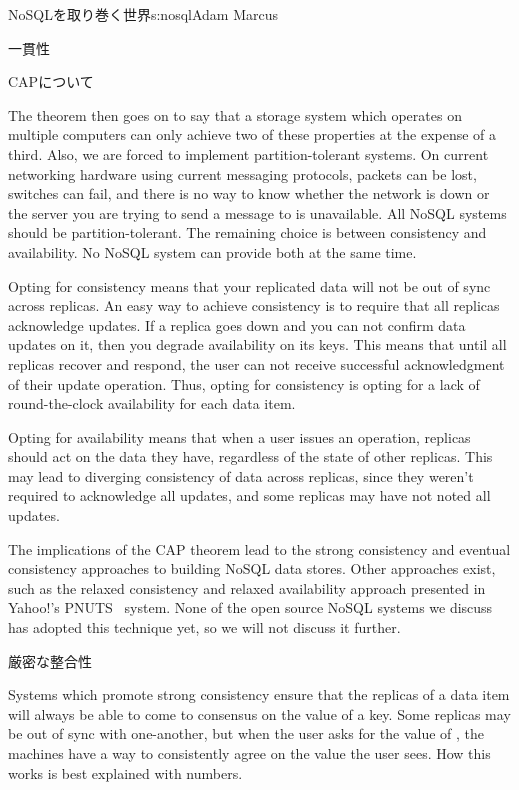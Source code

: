 \begin{aosachapter}{NoSQLを取り巻く世界}{s:nosql}{Adam Marcus}
\begin{aosasect1}{一貫性}
\begin{aosasect2}{CAPについて}
\begin{aosadescription}
\end{aosadescription}

The theorem then goes on to say that a storage system which operates on
multiple computers can only achieve two of these properties at the
expense of a third.  Also, we are forced to implement partition-tolerant
systems.  On current networking
hardware using current messaging protocols, packets can be lost,
switches can fail, and there is no way to know whether the network is
down or the server you are trying to send a message to is unavailable.
All NoSQL systems should be partition-tolerant.  The remaining choice
is between consistency and availability.  No NoSQL system can provide
both at the same time.

Opting for consistency means that your replicated data will not be out
of sync across replicas.  An easy way to achieve consistency is to
require that all replicas acknowledge updates.  If a replica goes down
and you can not confirm data updates on it, then you degrade
availability on its keys.  This means that until all replicas recover and respond, the user can not
receive successful acknowledgment of their update operation.  Thus, opting
for consistency is opting for a lack of round-the-clock availability
for each data item.

Opting for availability means that when a user issues an operation,
replicas should act on the
data they have, regardless of the state of other replicas.  This may
lead to diverging consistency of data across replicas, since they
weren't required to acknowledge all updates, and some replicas may
have not noted all updates.

The implications of the CAP theorem lead to the strong consistency and
eventual consistency approaches to building NoSQL data stores.  Other
approaches exist, such as the relaxed consistency and relaxed
availability approach presented in Yahoo!'s PNUTS~\cite{bib:pnuts} system.  None of
the open source NoSQL systems we discuss has adopted this technique yet,
so we will not discuss it further.

\end{aosasect2}

\begin{aosasect2}{厳密な整合性}

Systems which promote strong consistency ensure that the replicas of a
data item will always be able to come to consensus on the value of a
key.  Some replicas may be out of sync with one-another, but when the
user asks for the value of , the machines have
a way to consistently agree on the value the user sees.  How this
works is best explained with numbers.


\end{aosasect2}
\end{aosasect1}
\end{aosachapter}
